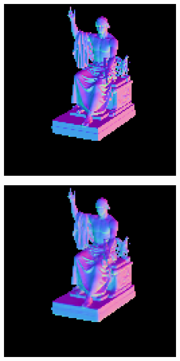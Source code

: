 \begin{figure}
\begin{subfigure}[b]{0.19\linewidth}
\end{subfigure}
	\begin{subfigure}[b]{0.19\linewidth}
		\includegraphics[width=\linewidth]{./Figures/gcnn_synthetic/fancy_eval_3_groundtruth.png}
	\end{subfigure}
	\begin{subfigure}[b]{0.19\linewidth}
		\includegraphics[width=\linewidth]{./Figures/gcnn_synthetic/fancy_eval_3_normal_an2-8-1000.png}

\end{subfigure}
\end{figure}
